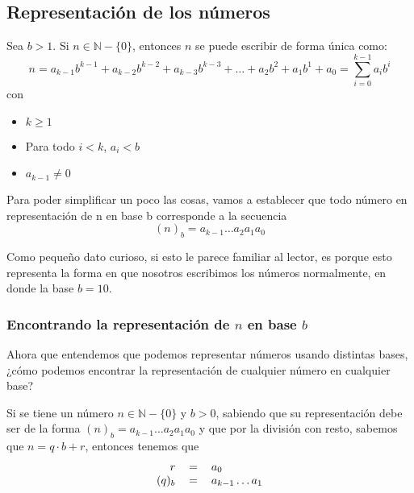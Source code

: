 \documentclass[../main.tex]{subfiles}
\begin{document}
\subsection{Representación de los números}
Sea $b > 1$. Si $n \in \mathds{N} - \{ 0 \}$, entonces $n$ se puede escribir de forma única como:
\[ n = a_{k-1} b^{k-1} + a_{k-2} b^{k-2} + a_{k-3} b^{k-3} + \ldots + a_{2} b^{2} + a_{1} b^{1} + a_{0} = \sum_{i = 0}^{k - 1} a_i b^i \]
con
\begin{itemize}
    \item $k \geq 1$
    \item Para todo $i < k$, $a_i < b$
    \item $a_{k-1} \not= 0$
\end{itemize}

Para poder simplificar un poco las cosas, vamos a establecer que todo número en representación de n en base b corresponde a la secuencia
\[ (n)_b = a_{k-1} \ldots a_2 a_1 a_0 \]

Como pequeño dato curioso, si esto le parece familiar al lector, es porque esto representa la forma en que nosotros escribimos los números normalmente, en donde la base $b = 10$.

\subsubsection[Encontrando la representación de n en base b]{Encontrando la representación de $n$ en base $b$}
Ahora que entendemos que podemos representar números usando distintas bases, ¿cómo podemos encontrar la representación de cualquier número en cualquier base?

Si se tiene un número $n \in \mathds{N} - \{ 0 \}$ y $b > 0$, sabiendo que su representación debe ser de la forma $(n)_b = a_{k-1} \ldots a_2 a_1 a_0 $ y que por la división con resto, sabemos que $n = q \cdot b + r$, entonces tenemos que
\[
    \begin{tabular}{rcl}
        $r$ & $=$ & $a_0$\\
        $(q)_b$ & $=$ & $a_{k-1} \ldots a_1$\\
    \end{tabular}
\]
\end{document}
